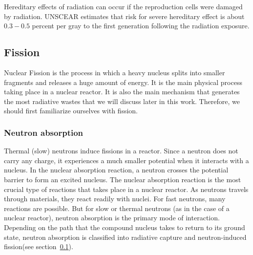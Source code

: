 \documentclass[nofootinbib,preprint,aps]{revtex4-1}
\newcommand{\red}[1]{\textcolor{red}{\bf #1}}
\begin{document}
        Hereditary effects of radiation can occur if the reproduction cells were damaged by radiation.
        UNSCEAR estimates that risk for severe hereditary effect is about $0.3-0.5$ percent per gray to
        the first generation following the radiation exposure.\cite{u16, unscear12}


    \subsection{Fission}
    \label{sec:fission}
        Nuclear Fission is the process in which a heavy nucleus splits into smaller fragments and releases
        a huge amount of energy. It is the main physical process taking place in a nuclear reactor. It is
        also the main mechanism that generates the most radiative wastes that we will discuss later
        in this work. Therefore, we should first familiarize ourselves with fission.
    \subsubsection{Neutron absorption}
    \label{sec:capture}
    Thermal (slow) neutrons induce fissions in a reactor.
    Since a neutron does not carry any charge, it experiences a much smaller potential when it interacts
    with a nucleus. In the nuclear absorption reaction, a neutron crosses the potential barrier to form
    an excited nucleus.
    The nuclear absorption reaction is the most crucial type of reactions that takes place in
    a nuclear reactor. As neutrons travels through materials, they react readily with nuclei.
    For fast neutrons, many reactions are possible. But for slow or thermal neutrons (as in the
    case of a nuclear reactor), neutron absorption is the primary mode of interaction.
    Depending on the path that the compound nucleus takes to return to its ground
    state, neutron absorption is classified into radiative capture and neutron-induced
    fission(see section~\ref{sec:fission}).
    
\end{document}
